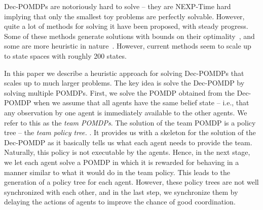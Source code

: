 \documentclass[letterpaper]{article} %
\begin{document}
Dec-POMDPs are notoriously hard to solve -- they are NEXP-Time hard~\cite{} implying that only the smallest toy problems are perfectly solvable.
However, quite a lot of methods for solving it have been proposed, with steady progress. Some of these methods generate solutions with bounds on
their optimality~\cite{}, and some are more heuristic in nature~\cite{}. However, current methods seem to scale up to state spaces with roughly 200 states.


In this paper we describe a heuristic approach for solving Dec-POMDPs that scales up to much larger problems. The key idea is solve the Dec-POMDP by
solving multiple POMDPs. First, we solve the POMDP obtained from the Dec-POMDP when we assume that all agents have the same belief state -- i.e.,
that any observation by one agent is immediately available to the other agents. We refer to this as the {\em team POMDPs}. The solution of the team
POMDP is a policy tree -- the {\em team policy tree.} . It provides us with a skeleton for the solution of the Dec-POMDP as it basically tells us what each agent needs to provide the team. Naturally, this policy is not executable by the agents. Hence, in the next stage, we let each agent solve a POMDP in which it is rewarded
for behaving in a manner similar to what it would do in the team policy. This leads to the generation of a policy tree for each agent. 
However, these policy trees are not well synchronized with each other, and in the last step, we synchronize them by delaying the actions of agents to
improve the chance of good coordination. 
\end{document}
